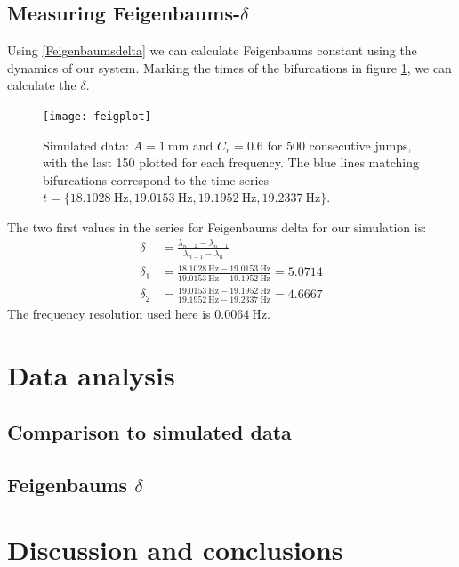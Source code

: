 \documentclass[12pt,oneside,a4paper]{article}
\numberwithin{equation}{section}
\begin{document}
{{{{\subsection{Measuring Feigenbaums-$\delta$}
Using \eqref{Feigenbaumsdelta} we can calculate Feigenbaums constant using the dynamics of our system. Marking the times of the bifurcations in figure  \ref{feigsim}, we can calculate the $\delta$.
\begin{figure}[h]
\centering
\texttt{[image: feigplot]} 
\caption{Simulated data: $A=\SI{1}{\mm}$ and $C_r=\si{0.6}$ for 500 consecutive jumps, with the last 150 plotted for each frequency. The blue lines matching bifurcations correspond to the time series $t=\{\SI{18.1028}{\hertz},\SI{19.0153}{\hertz},\SI{19.1952}{\hertz},\SI{19.2337}{\hertz} \}$.}\label{feigsim}
\end{figure}
The two first values in the series for Feigenbaums delta for our simulation is:
\begin{align*}
\delta&=\frac{\lambda_{n-2} - \lambda_{n-1}}{\lambda_{n-1}-\lambda_n}\\
\delta_1&=\frac{\SI{18.1028}{\hertz}-\SI{19.0153}{\hertz}}{\SI{19.0153}{\hertz}-\SI{19.1952}{\hertz}} = 5.0714\\
\delta_2&=\frac{\SI{19.0153}{\hertz}-\SI{19.1952}{\hertz}}{\SI{19.1952}{\hertz}-\SI{19.2337}{\hertz}} = 4.6667
\end{align*}
The frequency resolution used here is $\SI{0.0064}{\hertz}$.
\section{Data analysis}
\subsection{Comparison to simulated data}
\subsection{Feigenbaums $\delta$}
\section{Discussion and conclusions}
\newpage



\newpage
\appendix
}}}}
\end{document}
